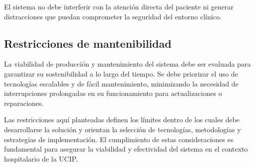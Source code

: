 El sistema no debe interferir con la atención directa del paciente ni generar distracciones que puedan comprometer la seguridad del entorno clínico.

\medskip

\subsection{Restricciones de mantenibilidad}

La viabilidad de producción y mantenimiento del sistema debe ser evaluada para garantizar su sostenibilidad a lo largo del tiempo. Se debe priorizar el uso de tecnologías escalables y de fácil mantenimiento, minimizando la necesidad de interrupciones prolongadas en su funcionamiento para actualizaciones o reparaciones.

Las restricciones aquí planteadas definen los límites dentro de los cuales debe desarrollarse la solución y orientan la selección de tecnologías, metodologías y estrategias de implementación. El cumplimiento de estas consideraciones es fundamental para asegurar la viabilidad y efectividad del sistema en el contexto hospitalario de la UCIP.
